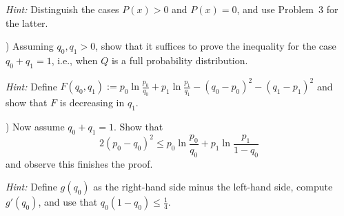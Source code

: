 \documentclass[fontsize=11pt, parskip=half]{scrartcl}
\newcommand{\mysubsection}[2]{\romannumeral #1) #2}
\begin{document}
\textit{Hint:} Distinguish the cases $P(x) > 0$ and $P(x) = 0$, and use Problem~3 for the latter.

\mysubsection{2}{Assuming $q_0, q_1 > 0$, show that it suffices to prove the inequality for the case $q_0 + q_1 = 1$, i.e., when $Q$ is a full probability distribution.}

\textit{Hint:} Define $F(q_0, q_1) := p_0 \ln \frac{p_0}{q_0} + p_1 \ln \frac{p_1}{q_1} - (q_0 - p_0)^2 - (q_1 - p_1)^2$ and show that $F$ is decreasing in $q_1$.

\mysubsection{3}{Now assume $q_0 + q_1 = 1$. Show that}
\[
2(p_0 - q_0)^2 \leq p_0 \ln \frac{p_0}{q_0} + p_1 \ln \frac{p_1}{1 - q_0}
\]
and observe this finishes the proof.

\textit{Hint:} Define $g(q_0)$ as the right-hand side minus the left-hand side, compute $g'(q_0)$, and use that $q_0(1 - q_0) \leq \frac{1}{4}$.
\end{document}
